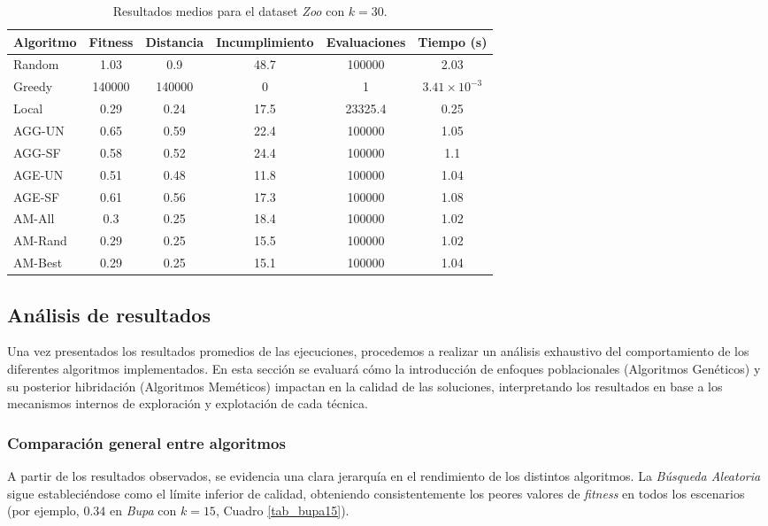 \documentclass[a4paper,12pt]{article}%
\begin{document}
\begin{table}[H]
	\centering
	\begin{tabular}{|l|ccccc|}
		\hline
		Algoritmo & Fitness & Distancia & Incumplimiento & Evaluaciones & Tiempo (s) \\
		\hline
		Random & 1.03 & 0.9 & 48.7 & 100000 & 2.03 \\
		Greedy & 140000 & 140000 & 0 & 1 & $3.41\times10^{-3}$ \\
		Local  & 0.29 & 0.24 & 17.5 & 23325.4 & 0.25 \\
		AGG-UN & 0.65 & 0.59 & 22.4 & 100000 & 1.05 \\
		AGG-SF & 0.58 & 0.52 & 24.4 & 100000 & 1.1 \\
		AGE-UN & 0.51 & 0.48 & 11.8 & 100000 & 1.04 \\
		AGE-SF & 0.61 & 0.56 & 17.3 & 100000 & 1.08 \\
		AM-All & 0.3 & 0.25 & 18.4 & 100000 & 1.02 \\
		AM-Rand & 0.29 & 0.25 & 15.5 & 100000 & 1.02 \\
		AM-Best & 0.29 & 0.25 & 15.1 & 100000 & 1.04 \\
		\hline
	\end{tabular}
	\caption{Resultados medios para el dataset \textit{Zoo} con $k=30$.}
	\label{tab_zoo30}
\end{table}

\subsection{Análisis de resultados}

\noindent Una vez presentados los resultados promedios de las ejecuciones, procedemos a realizar un análisis exhaustivo del comportamiento de los diferentes algoritmos implementados. En esta sección se evaluará cómo la introducción de enfoques poblacionales (Algoritmos Genéticos) y su posterior hibridación (Algoritmos Meméticos) impactan en la calidad de las soluciones, interpretando los resultados en base a los mecanismos internos de exploración y explotación de cada técnica.

\subsubsection{Comparación general entre algoritmos}

\noindent A partir de los resultados observados, se evidencia una clara jerarquía en el rendimiento de los distintos algoritmos. La \textit{Búsqueda Aleatoria} sigue estableciéndose como el límite inferior de calidad, obteniendo consistentemente los peores valores de \textit{fitness} en todos los escenarios (por ejemplo, $0.34$ en \textit{Bupa} con $k=15$, Cuadro \ref{tab_bupa15}).
\end{document}
